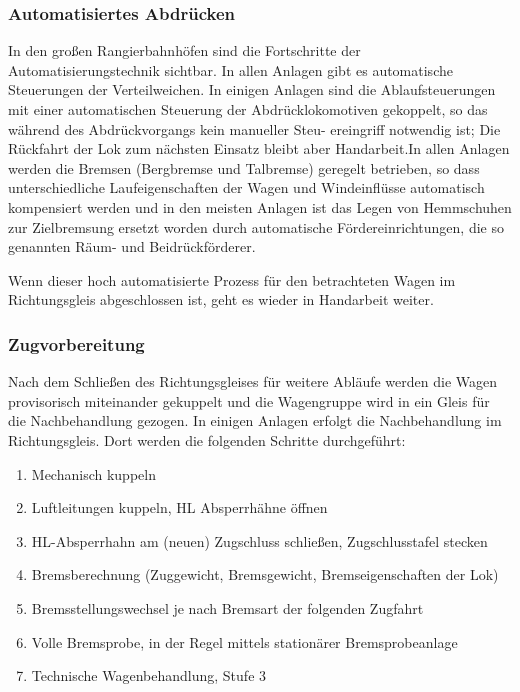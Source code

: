 \subsubsection{Automatisiertes Abdrücken}\label{sec:automAbdruecken}
In den großen Rangierbahnhöfen sind die Fortschritte der Automatisierungstechnik sichtbar. In allen Anlagen gibt es automatische Steuerungen der Verteilweichen. In einigen Anlagen sind die Ablaufsteuerungen mit einer automatischen Steuerung der Abdrücklokomotiven gekoppelt, so das während des Abdrückvorgangs kein manueller Steu- ereingriff notwendig ist; Die Rückfahrt der Lok zum nächsten Einsatz bleibt aber Handarbeit.In allen Anlagen werden die Bremsen (\gls{Bergbremse} und \gls{Talbremse}) geregelt betrieben, so dass unterschiedliche Laufeigenschaften der Wagen und Windeinflüsse automatisch kompensiert werden und in den meisten Anlagen ist das Legen von Hemmschuhen zur Zielbremsung ersetzt worden durch automatische Fördereinrichtungen, die so genannten Räum- und Beidrückförderer.\par
Wenn dieser hoch automatisierte Prozess für den betrachteten Wagen im Richtungsgleis abgeschlossen ist, geht es wieder in Handarbeit weiter.
\subsubsection{Zugvorbereitung}\label{sec:Zugvorbereitung}
Nach dem Schließen des Richtungsgleises für weitere Abläufe werden die Wagen provisorisch miteinander gekuppelt und die Wagengruppe wird in ein Gleis für die Nachbehandlung gezogen. In einigen Anlagen erfolgt die Nachbehandlung im Richtungsgleis. Dort werden die folgenden Schritte durchgeführt:
\begin{enumerate}
    \item Mechanisch kuppeln
    \item Luftleitungen kuppeln, \acrshort{HL} Absperrhähne öffnen
    \item \acrshort{HL}-Absperrhahn am (neuen) \gls{Zugschluss} schließen, Zugschlusstafel stecken
    \item Bremsberechnung (Zuggewicht, Bremsgewicht, Bremseigenschaften der Lok)
    \item Bremsstellungswechsel je nach Bremsart der folgenden \gls{Zugfahrt}
    \item Volle \gls{Bremsprobe}, in der Regel mittels stationärer \gls{Bremsprobeanlage}
    \item Technische Wagenbehandlung, Stufe 3
\end{enumerate}
